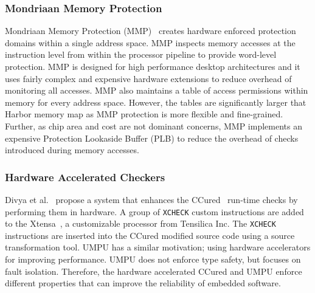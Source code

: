 \subsubsection{Mondriaan Memory Protection}
%
Mondriaan Memory Protection (MMP)~\cite{witchel-asplos02-mondrian}
creates hardware enforced protection domains within a single address
space.
%
MMP inspects memory accesses at the instruction level from within the
processor pipeline to provide word-level protection.
%
MMP is designed for high performance desktop architectures and it uses
fairly complex and expensive hardware extensions to reduce overhead of
monitoring all accesses.
%
MMP also maintains a table of access permissions within memory for
every address space.
%
However, the tables are significantly larger that Harbor memory map as
MMP protection is more flexible and fine-grained.
%
Further, as chip area and cost are not dominant concerns, MMP
implements an expensive Protection Lookaside Buffer (PLB) to reduce
the overhead of checks introduced during memory accesses.
%
\subsubsection{Hardware Accelerated Checkers}
%
Divya et al.~\cite{divya06ccured} propose a system that enhances the
CCured~\cite{ccured02necula} run-time checks by performing them in
hardware.
%
A group of \texttt{XCHECK} custom instructions are added to the
Xtensa~\cite{xtensads}, a customizable processor from Tensilica Inc.
%
The \texttt{XCHECK} instructions are inserted into the CCured modified
source code using a source transformation tool.
%
UMPU has a similar motivation; using hardware accelerators for
improving performance.
%
UMPU does not enforce type safety, but focuses on fault isolation.
%
Therefore, the hardware accelerated CCured and UMPU enforce different
properties that can improve the reliability of embedded software.

